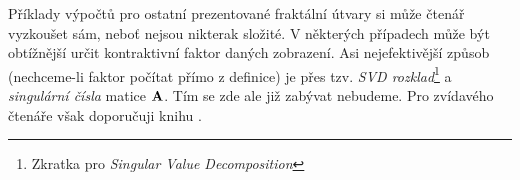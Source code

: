Příklady výpočtů pro ostatní prezentované fraktální útvary si může čtenář vyzkoušet sám, neboť nejsou nikterak složité. V některých případech může být obtížnější určit kontraktivní faktor daných zobrazení. Asi nejefektivější způsob (nechceme-li faktor počítat přímo z definice) je přes tzv. \emph{SVD rozklad}\footnote{Zkratka pro \emph{Singular Value Decomposition}} a \emph{singulární čísla} matice $\mathbf{A}$. Tím se zde ale již zabývat nebudeme. Pro zvídavého čtenáře však doporučuji knihu \cite{Hladik2019}.